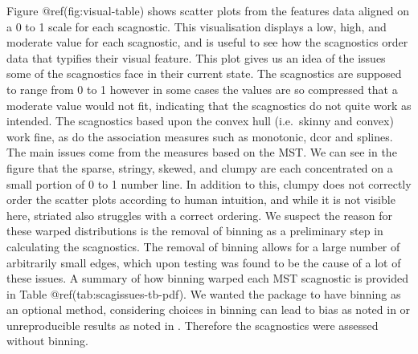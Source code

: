 Figure @ref(fig:visual-table) shows scatter plots from the features data
aligned on a 0 to 1 scale for each scagnostic. This visualisation
displays a low, high, and moderate value for each scagnostic, and is
useful to see how the scagnostics order data that typifies their visual
feature. This plot gives us an idea of the issues some of the
scagnostics face in their current state. The scagnostics are supposed to
range from 0 to 1 however in some cases the values are so compressed
that a moderate value would not fit, indicating that the scagnostics do
not quite work as intended. The scagnostics based upon the convex hull
(i.e.~skinny and convex) work fine, as do the association measures such
as monotonic, dcor and splines. The main issues come from the measures
based on the MST. We can see in the figure that the sparse, stringy,
skewed, and clumpy are each concentrated on a small portion of 0 to 1
number line. In addition to this, clumpy does not correctly order the
scatter plots according to human intuition, and while it is not visible
here, striated also struggles with a correct ordering. We suspect the
reason for these warped distributions is the removal of binning as a
preliminary step in calculating the scagnostics. The removal of binning
allows for a large number of arbitrarily small edges, which upon testing
was found to be the cause of a lot of these issues. A summary of how
binning warped each MST scagnostic is provided in Table
@ref(tab:scagissues-tb-pdf). We wanted the package to have binning as an
optional method, considering choices in binning can lead to bias as
noted in \citet{scagdist} or unreproducible results as noted in
\citet{robust}. Therefore the scagnostics were assessed without binning.

